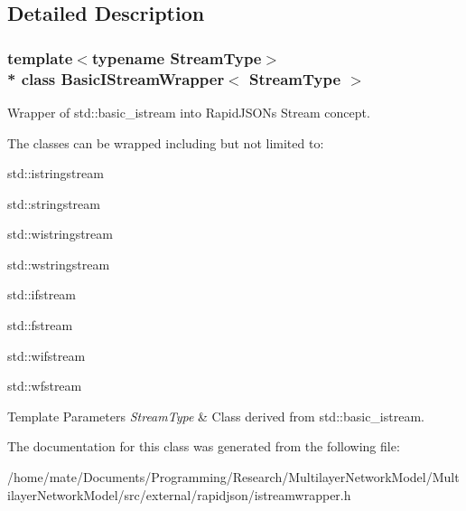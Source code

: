 \subsection{Detailed Description}
\subsubsection*{template$<$typename Stream\+Type$>$\\*
class Basic\+I\+Stream\+Wrapper$<$ Stream\+Type $>$}

Wrapper of {\ttfamily std\+::basic\+\_\+istream} into Rapid\+J\+S\+ON\textquotesingle{}s Stream concept. 

The classes can be wrapped including but not limited to\+:


\begin{DoxyItemize}
\item {\ttfamily std\+::istringstream} 
\item {\ttfamily std\+::stringstream} 
\item {\ttfamily std\+::wistringstream} 
\item {\ttfamily std\+::wstringstream} 
\item {\ttfamily std\+::ifstream} 
\item {\ttfamily std\+::fstream} 
\item {\ttfamily std\+::wifstream} 
\item {\ttfamily std\+::wfstream} 
\end{DoxyItemize}


\begin{DoxyTemplParams}{Template Parameters}
{\em Stream\+Type} & Class derived from {\ttfamily std\+::basic\+\_\+istream}. \\
\hline
\end{DoxyTemplParams}


The documentation for this class was generated from the following file\+:\begin{DoxyCompactItemize}
\item 
/home/mate/\+Documents/\+Programming/\+Research/\+Multilayer\+Network\+Model/\+Multilayer\+Network\+Model/src/external/rapidjson/istreamwrapper.\+h\end{DoxyCompactItemize}

